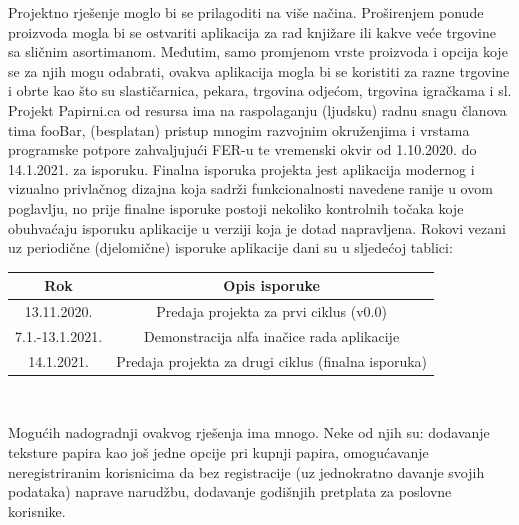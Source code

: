 		\noindent \normalsize{Projektno rješenje moglo bi se prilagoditi na više načina. Proširenjem ponude proizvoda mogla bi se ostvariti aplikacija za rad knjižare ili kakve veće trgovine sa sličnim asortimanom. Međutim, samo promjenom vrste proizvoda i opcija koje se za njih mogu odabrati, ovakva aplikacija mogla bi se koristiti za razne trgovine i obrte kao što su slastičarnica, pekara, trgovina odjećom, trgovina igračkama i sl.} \\
		
		\noindent \normalsize{Projekt Papirni.ca od resursa ima na raspolaganju (ljudsku) radnu snagu članova tima fooBar, (besplatan) pristup mnogim razvojnim okruženjima i vrstama programske potpore zahvaljujući FER-u te vremenski okvir od 1.10.2020. do 14.1.2021. za isporuku. Finalna isporuka projekta jest aplikacija modernog i vizualno privlačnog dizajna koja sadrži funkcionalnosti navedene ranije u ovom poglavlju, no prije finalne isporuke postoji nekoliko kontrolnih točaka koje obuhvaćaju isporuku aplikacije u verziji koja je dotad napravljena. Rokovi vezani uz periodične (djelomične) isporuke aplikacije dani su u sljedećoj tablici:} \\
		
		\begin{center}
			\begin{tabular}{ |c|c| } 
				\hline
				\textbf {Rok}& \textbf{Opis isporuke}  \\
				\hline
				13.11.2020. & Predaja projekta za prvi ciklus (v0.0)  \\
				\hline
				7.1.-13.1.2021. & Demonstracija alfa inačice rada  aplikacije  \\
				\hline
				14.1.2021. & Predaja projekta za drugi ciklus (finalna isporuka)  \\
				\hline
				
				
				\hline
			\end{tabular}
		\end{center}
		
		\noindent \normalsize{\\}
		
		\noindent \normalsize{Mogućih nadogradnji ovakvog rješenja ima mnogo. Neke od njih su: dodavanje teksture papira kao još jedne opcije pri kupnji papira, omogućavanje neregistriranim korisnicima da bez registracije (uz jednokratno davanje svojih podataka) naprave narudžbu, dodavanje godišnjih pretplata za poslovne korisnike.} \\
		
	
		
		\eject
		
	